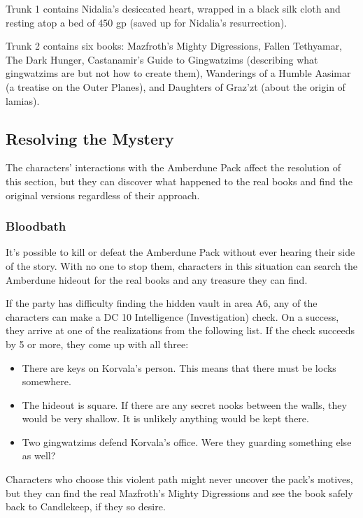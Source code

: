 \documentclass[10pt,a4paper,twoside,bg=print,twocolumn,openany,nodeprecatedcode]{dndbook}
\begin{document}
Trunk 1 contains Nidalia's desiccated heart, wrapped in a black silk cloth and resting atop a bed of 450 gp (saved up for Nidalia's resurrection).

Trunk 2 contains six books: Mazfroth's Mighty Digressions, Fallen Tethyamar, The Dark Hunger, Castanamir's Guide to Gingwatzims (describing what gingwatzims are but not how to create them), Wanderings of a Humble Aasimar (a treatise on the Outer Planes), and Daughters of Graz'zt (about the origin of lamias).

\subsection{Resolving the Mystery}
The characters' interactions with the Amberdune Pack affect the resolution of this section, but they can discover what happened to the real books and find the original versions regardless of their approach.

\subsubsection{Bloodbath}
It's possible to kill or defeat the Amberdune Pack without ever hearing their side of the story. With no one to stop them, characters in this situation can search the Amberdune hideout for the real books and any treasure they can find.

If the party has difficulty finding the hidden vault in area A6, any of the characters can make a DC 10 Intelligence (Investigation) check. On a success, they arrive at one of the realizations from the following list. If the check succeeds by 5 or more, they come up with all three:


\begin{itemize}
\item There are keys on Korvala's person. This means that there must be locks somewhere.
\item The hideout is square. If there are any secret nooks between the walls, they would be very shallow. It is unlikely anything would be kept there.
\item Two gingwatzims defend Korvala's office. Were they guarding something else as well?
\end{itemize}

Characters who choose this violent path might never uncover the pack's motives, but they can find the real Mazfroth's Mighty Digressions and see the book safely back to Candlekeep, if they so desire.
\end{document}
